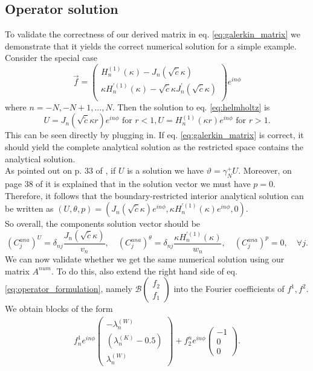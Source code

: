 \documentclass[12pt,journal,compsoc, onecolumn]{IEEEtran}
\begin{document}
\subsection{Operator solution}
To validate the correctness of our derived matrix in eq. \ref{eq:galerkin_matrix} we demonstrate that it yields the correct numerical solution for a simple example. 
Consider the special case
$$
\vec{f} = 
\begin{pmatrix}
    H_n^{(1)}(\kappa) -  J_n(\sqrt{\tilde c} \kappa ) \\
    \kappa H_n^{\prime (1)}(\kappa) - \sqrt{\tilde c} \kappa J_n^{\prime}(\sqrt{\tilde c} \kappa )\\
\end{pmatrix} e^{i n \phi}
$$
where $n =-N, -N+1, ..., N$. 
Then the solution to eq. \ref{eq:helmholtz} is 
$$
U = J_n(\sqrt{\tilde c} \kappa r) e^{i n \phi} \text{ for }r < 1, U = H_n^{(1)}(\kappa r)e^{i n \phi} \text{ for } r > 1.
$$
This can be seen directly by plugging in.
If eq. \ref{eq:galerkin_matrix} is correct, it should yield the complete analytical solution as the restricted space contains the analytical solution. \\
As pointed out on p. 33 of \cite{meury2007stable}, if \(U\) is a solution we have \(\vartheta=\gamma_{N}^{+} U\). Moreover, on page 38 of \cite{meury2007stable} it is explained that in the solution vector we must have $p =0$. Therefore, it follows that the boundary-restricted interior analytical solution can be written as 
$(U, \theta, p) =
 \left({J_n(\sqrt{\tilde c}\kappa)e^{in\phi}} , {\kappa H_n^{\prime(1)}(\kappa)} e^{in\phi}, 0\right)$. \\
So overall, the components solution vector should be
$$
    (C_j^{ana})^U = \delta_{nj}  \frac{J_n(\sqrt{\tilde c}\kappa)}{v_n}, \quad
    (C_j^{ana})^\theta = \delta_{nj} \frac{\kappa H_n^{\prime(1)}(\kappa)}{w_n}, \quad 
    (C_j^{ana})^p = 0, \quad
    \forall j.
$$
We can now validate whether we get the same numerical solution using our matrix ${A}^{num}$. To do this, also extend the right hand side of eq. \ref{eq:operator_formulation}, namely $\mathcal{B}\begin{pmatrix} f_2 \\ f_1 \end{pmatrix}$ into the Fourier coefficients of $f^1, f^2$. We obtain blocks of the form 
\begin{align}
f^1_n e^{in\phi} 
\begin{pmatrix}
- \lambda_n^{(W)} \\
(\lambda_n^{(K)} - 0.5)  \\
\lambda_n^{(W)} 
\end{pmatrix}
+ f_2^n e^{in\phi} 
\begin{pmatrix}
    -1 \\
    0 \\
    0
\end{pmatrix}.
\end{align}
\end{document}
